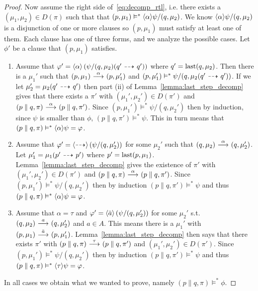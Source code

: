 \begin{proof}
    \rtl Now assume the right side of~\eqref{eq:decomp_rtl}, i.e. there exists a $(\mu_1,\mu_2)
    \in D(\pi)$ such that that $(p,\mu_1) \vDash^* \mbox{\ensuremath{\langle \alpha \rangle}}\psi / (q,\mu_2)$.
    We know $\mbox{\ensuremath{\langle \alpha \rangle}}\psi / (q,\mu_2)$ is a disjunction of one or more clauses
    so $(p,\mu_1)$ must satisfy at least one of them. Each clause has one of three
    forms, and we analyze the possible cases.
    Let $\phi'$ be a clause that $(p,\mu_1)$ satisfies.
    \begin{enumerate}
        \item Assume that $\varphi' = \mbox{\ensuremath{\langle \alpha \rangle}} \left(\psi / (q,\mu_2)(q' \ {\stackrel{_{}}{\dashrightarrow}}\  q') \right)$
            where $q' = \operatorname{last}(q,\mu_2)$.
            Then there is a $\mu_1'$ such that $(p,\mu_1) \ {\stackrel{{\alpha}}{\longrightarrow}}\  (p,\mu_1')$
            and $(p,\mu_1') \vDash^* \psi/(q,\mu_2(q'\ {\stackrel{_{}}{\dashrightarrow}}\ q'))$. If
            we let $\mu_2' = \mu_2(q' \ {\stackrel{_{}}{\dashrightarrow}}\  q')$ then 
            part (ii) of
            Lemma~\ref{lemma:last_step_decomp}
            gives that there exists a $\pi'$ with $(\mu_1',\mu_2')\in D(\pi')$ and
            $(p\parallel q, \pi) \ {\stackrel{{\alpha}}{\longrightarrow}}\  (p\parallel q, \pi')$.
            Since $(p,\mu_1')
            \vDash^* \psi / (q,\mu_2')$ then by induction, since $\psi$ is smaller than
            $\phi$, $(p\parallel q, \pi') \vDash^* \psi$. This in turn means that
            $(p\parallel q, \pi) \vDash^* \mbox{\ensuremath{\langle \alpha \rangle}}\psi = \varphi$.
        \item Assume that $\varphi' = \mbox{\ensuremath{\langle\stackrel{_{}}{\dashrightarrow}\rangle}} \left(\psi / (q,\mu_2')\right)$ for some $\mu_2'$
            such that $(q,\mu_2) \ {\stackrel{{\alpha}}{\longrightarrow}}\  (q,\mu_2')$. Let $\mu_1' = \mu_1(p'
            \ {\stackrel{_{}}{\dashrightarrow}}\  p')$ where $p' = \operatorname{last}(p,\mu_1)$. Lemma~\ref{lemma:last_step_decomp}
            gives the existence of $\pi'$ with $(\mu_1',\mu_2')\in D(\pi')$ and $(p\parallel
            q,\pi) \ {\stackrel{{\alpha}}{\longrightarrow}}\  (p\parallel q, \pi')$. Since $(p,\mu_1')\vDash^* \psi
            / (q,\mu_2')$ then by induction $(p\parallel q,\pi') \vDash^* \psi$ and thus
            $(p\parallel q, \pi) \vDash^* \mbox{\ensuremath{\langle \alpha \rangle}}\psi = \varphi$.
        \item Assume that $\alpha = \tau$ and $\varphi' = \mbox{\ensuremath{\langle \bar{a} \rangle}} \left( \psi / (q,\mu_2') \right)$
            for some $\mu_2'$ s.t. $(q,\mu_2)\ {\stackrel{{a}}{\longrightarrow}}\ (q,\mu_2')$ and $a\in A$.
            This means there is a
            $\mu_1'$ with $(p,\mu_1) \ {\stackrel{{\bar{a}}}{\longrightarrow}}\  (p,\mu_1')$.
            Lemma~\ref{lemma:last_step_decomp} then says that there exists $\pi'$ with $(p
            \parallel q, \pi) \ {\stackrel{{\tau}}{\longrightarrow}}\  (p\parallel q, \pi')$ and $(\mu_1',\mu_2')
            \in D(\pi')$. Since $(p,\mu_1')\vDash^* \psi / (q,\mu_2')$ then by induction
            $(p\parallel q,\pi')\vDash^* \psi$ and thus $(p\parallel q, \pi) \vDash^*
            \mbox{\ensuremath{\langle \tau \rangle}}\psi = \varphi$.
    \end{enumerate}
    In all cases we obtain what we wanted to prove, namely $(p\parallel q, \pi) \vDash^* \phi$.



\end{proof}
